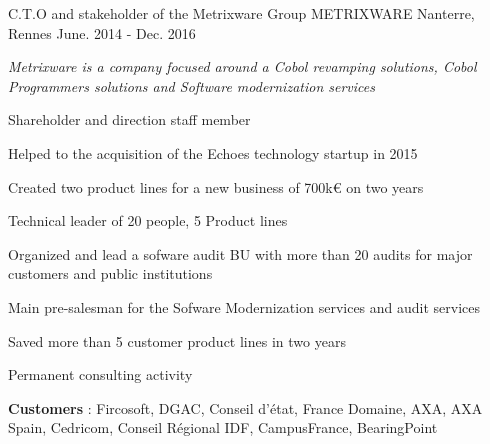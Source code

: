 

\begin{cventries}

  \cventry
    {C.T.O and stakeholder of the Metrixware Group} %
    {METRIXWARE} %
    {Nanterre, Rennes} %
    {June. 2014 - Dec. 2016} %
    {
      \begin{cvitems} %
        \item {\textit{Metrixware is a company focused around a Cobol revamping solutions, Cobol Programmers solutions and Software modernization services}}
        \item {Shareholder and direction staff member}
        \item {Helped to the acquisition of the Echoes technology startup in 2015}
        \item {Created two product lines for a new business of 700k€ on two years}
        \item {Technical leader of 20 people, 5 Product lines}
        \item {Organized and lead a sofware audit BU with more than 20 audits for major customers and public institutions}
        \item {Main pre-salesman for the Sofware Modernization services and audit services}
        \item {Saved more than 5 customer product lines in two years}
        \item {Permanent consulting activity}
        \item {\textbf{Customers} : Fircosoft, DGAC, Conseil d'état, France Domaine, AXA, AXA Spain, Cedricom, Conseil Régional IDF, CampusFrance, BearingPoint}
      \end{cvitems}
    }


\end{cventries}
